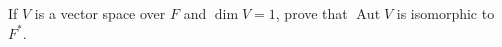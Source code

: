 If $V$ is a vector space over $F$ and $\dim V = 1$, prove that $\operatorname{Aut} V$ is isomorphic to $F^*$.
